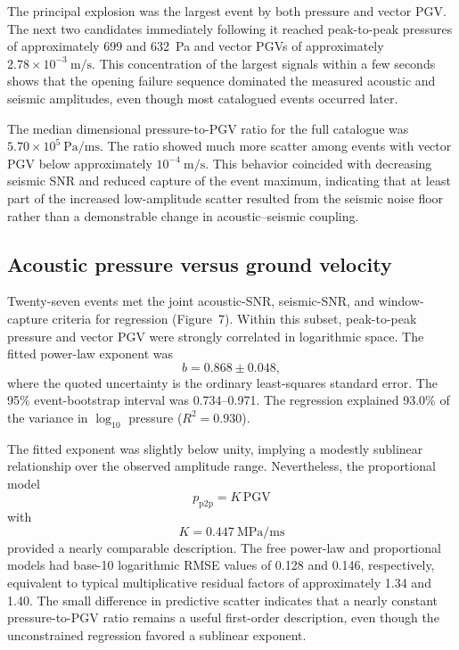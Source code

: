 \documentclass[12pt]{article}
\begin{document}
The principal explosion was the largest event by both pressure and vector PGV.
The next two candidates immediately following it reached peak-to-peak pressures
of approximately 699 and \SI{632}{\pascal} and vector PGVs of approximately
$2.78\times10^{-3}\ \si{\metre\per\second}$. This concentration of the largest
signals within a few seconds shows that the opening failure sequence dominated
the measured acoustic and seismic amplitudes, even though most catalogued events
occurred later.

The median dimensional pressure-to-PGV ratio for the full catalogue was
$5.70\times10^{5}\ \si{\pascal\per\metre\second}$. The ratio showed much more
scatter among events with vector PGV below approximately
$10^{-4}\ \si{\metre\per\second}$. This behavior coincided with decreasing
seismic SNR and reduced capture of the event maximum, indicating that at least
part of the increased low-amplitude scatter resulted from the seismic noise
floor rather than a demonstrable change in acoustic--seismic coupling.

\subsection{Acoustic pressure versus ground velocity}

Twenty-seven events met the joint acoustic-SNR, seismic-SNR, and window-capture
criteria for regression (Figure~7). Within this subset, peak-to-peak pressure and
vector PGV were strongly correlated in logarithmic space. The fitted power-law
exponent was
\begin{equation}
  b = 0.868 \pm 0.048,
\end{equation}
where the quoted uncertainty is the ordinary least-squares standard error. The
95\% event-bootstrap interval was 0.734--0.971. The regression explained 93.0\%
of the variance in $\log_{10}$ pressure ($R^2=0.930$).

The fitted exponent was slightly below unity, implying a modestly sublinear
relationship over the observed amplitude range. Nevertheless, the proportional
model
\begin{equation}
  p_{\mathrm{p2p}} = K\,\mathrm{PGV}
\end{equation}
with
\begin{equation}
  K = \SI{0.447}{\mega\pascal\per\metre\second}
\end{equation}
provided a nearly comparable description. The free power-law and proportional
models had base-10 logarithmic RMSE values of 0.128 and 0.146, respectively,
equivalent to typical multiplicative residual factors of approximately 1.34 and
1.40. The small difference in predictive scatter indicates that a nearly
constant pressure-to-PGV ratio remains a useful first-order description, even
though the unconstrained regression favored a sublinear exponent.
\end{document}

